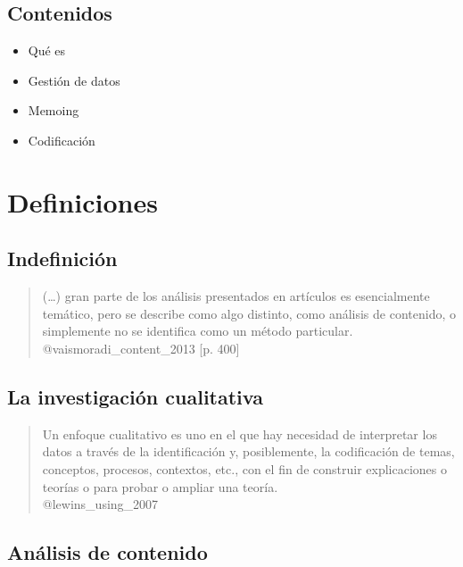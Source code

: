 \hypertarget{indice}{%
\subsection{Contenidos}\label{indice}}

\begin{itemize}
\tightlist
\item
  Qué es
\item
  Gestión de datos
\item
  Memoing
\item
  Codificación
\end{itemize}

\hypertarget{definiciones}{%
\section{Definiciones}\label{definiciones}}

\hypertarget{indefinicion}{%
\subsection{Indefinición}\label{indefinicion}}

\begin{quote}
(\ldots{}) gran parte de los análisis presentados en artículos es
esencialmente temático, pero se describe como algo distinto, como
análisis de contenido, o simplemente no se identifica como un método
particular.\\
@vaismoradi\_content\_2013 {[}p. 400{]}
\end{quote}

\hypertarget{la-investigacion-cualitativa}{%
\subsection{La investigación
cualitativa}\label{la-investigacion-cualitativa}}

\begin{quote}
Un enfoque cualitativo es uno en el que hay necesidad de interpretar los
datos a través de la identificación y, posiblemente, la codificación de
temas, conceptos, procesos, contextos, etc., con el fin de construir
explicaciones o teorías o para probar o ampliar una teoría.\\
@lewins\_using\_2007
\end{quote}

\hypertarget{analisis-contenido}{%
\subsection{Análisis de contenido}\label{analisis-contenido}}

